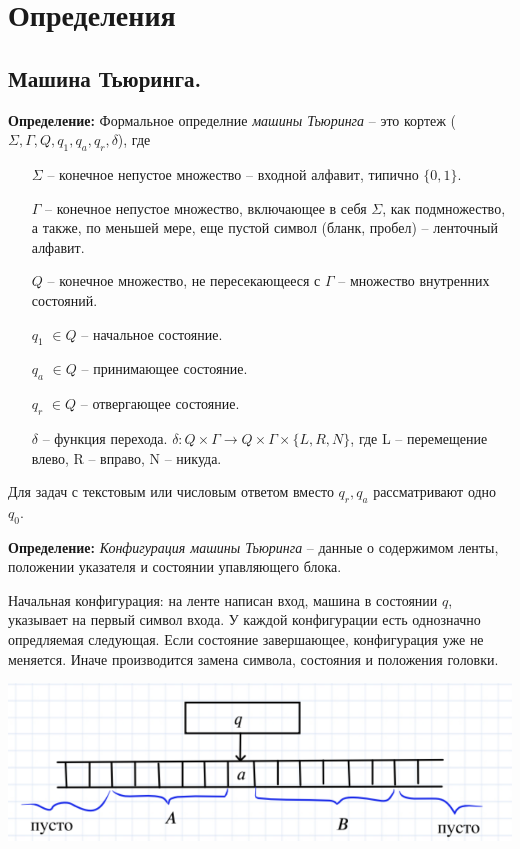 \section{Определения}

\subsection{Машина Тьюринга.}

\textbf{Определение: } Формальное определние \textit{машины Тьюринга} -- это кортеж ($\Sigma, \Gamma, Q, q_1, q_a, q_r, \delta$), где
\begin{itemize}
    \item[$\Sigma$] -- конечное непустое множество -- входной алфавит, типично $\{0,1\}$.
    \item[$\Gamma$] -- конечное непустое множество, включающее в себя $\Sigma$, как подмножество, а также, по меньшей мере, еще пустой символ (бланк, пробел) -- ленточный алфавит.
    \item[$Q$] -- конечное множество, не пересекающееся с $\Gamma$ -- множество внутренних состояний.
    \item[$q_1$]$\in Q$ -- начальное состояние.
    \item[$q_a$]$\in Q$ -- принимающее состояние.
    \item[$q_r$]$\in Q$ -- отвергающее состояние.
    \item[$\delta$] -- функция перехода. $\delta: Q\times\Gamma \rightarrow Q\times\Gamma \times\{L, R, N\}$, где L -- перемещение влево, R -- вправо, N -- никуда.
\end{itemize}

Для задач с текстовым или числовым ответом вместо $q_r, q_a$ рассматривают одно $q_0$.

\textbf{Определение: } \textit{Конфигурация машины Тьюринга} -- данные о содержимом ленты, положении указателя и состоянии упавляющего блока.

Начальная конфигурация: на ленте написан вход, машина в состоянии $q$, указывает на первый символ входа. У каждой конфигурации есть однозначно опредляемая следующая. Если состояние завершающее, конфигурация уже не меняется. Иначе производится замена символа, состояния и положения головки.

\includegraphics{images/3 (определения)_m31.PNG}

